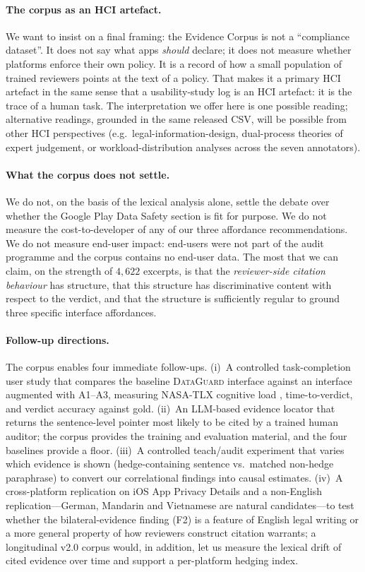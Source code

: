 \documentclass[11pt,a4paper]{article}
\newcommand{\dataguard}{\textsc{DataGuard}}
\begin{document}
\paragraph{The corpus as an HCI artefact.}
We want to insist on a final framing: the Evidence Corpus is not a
``compliance dataset''. It does not say what apps \emph{should}
declare; it does not measure whether platforms enforce their own
policy. It is a record of how a small population of trained
reviewers points at the text of a policy. That makes it a primary
HCI artefact in the same sense that a usability-study log is an HCI
artefact: it is the trace of a human task. The interpretation we
offer here is one possible reading; alternative readings, grounded in
the same released CSV, will be possible from other HCI perspectives
(e.g.\ legal-information-design, dual-process theories of expert
judgement, or workload-distribution analyses across the seven
annotators).

\paragraph{What the corpus does not settle.}
We do not, on the basis of the lexical analysis alone, settle the
debate over whether the Google Play Data Safety section
\citep{googledatasafety2022} is fit for purpose. We do not measure
the cost-to-developer of any of our three affordance recommendations.
We do not measure end-user impact: end-users were not part of the
audit programme and the corpus contains no end-user data. The most
that we can claim, on the strength of $4{,}622$ excerpts, is that the
\emph{reviewer-side citation behaviour} has structure, that this
structure has discriminative content with respect to the verdict,
and that the structure is sufficiently regular to ground three
specific interface affordances.

\paragraph{Follow-up directions.}
The corpus enables four immediate follow-ups. (i)~A controlled
task-completion user study that compares the baseline \dataguard{}
interface against an interface augmented with A1--A3, measuring
NASA-TLX cognitive load \citep{hart2008measurement}, time-to-verdict,
and verdict accuracy against gold. (ii)~An LLM-based evidence
locator that returns the sentence-level pointer most likely to be
cited by a trained human auditor; the corpus provides the training
and evaluation material, and the four baselines provide a floor.
(iii)~A controlled teach/audit experiment that varies which evidence
is shown (hedge-containing sentence vs.\ matched non-hedge
paraphrase) to convert our correlational findings into causal
estimates. (iv)~A cross-platform replication on iOS App Privacy
Details and a non-English replication---German, Mandarin and
Vietnamese are natural candidates---to test whether the
bilateral-evidence finding (F2) is a feature of English legal
writing or a more general property of how reviewers construct
citation warrants; a longitudinal v2.0 corpus would, in addition,
let us measure the lexical drift of cited evidence over time and
support a per-platform hedging index.
\end{document}
